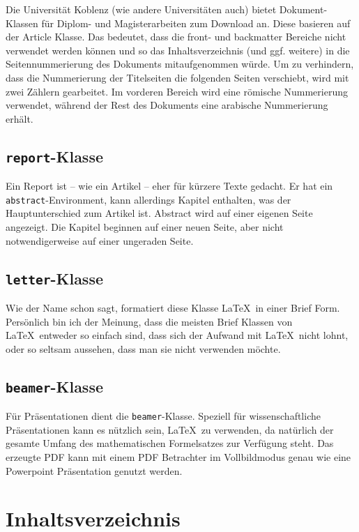  Die Universität Koblenz (wie andere Universitäten auch) bietet Doku\-ment-Klassen für Diplom- und Magisterarbeiten zum Download an. Diese basieren auf der Article Klasse. Das bedeutet, dass die front- und backmatter Bereiche nicht verwendet werden können und so das Inhaltsverzeichnis (und ggf. weitere) in die Seitennummerierung des Dokuments mitaufgenommen würde. Um zu verhindern, dass die Nummerierung der Titelseiten die folgenden Seiten verschiebt, wird mit zwei Zählern gearbeitet. Im vorderen Bereich wird eine römische Nummerierung verwendet, während der Rest des Dokuments eine arabische Nummerierung erhält.


\subsection{\texttt{report}-Klasse}

Ein Report ist -- wie ein Artikel -- eher für kürzere Texte gedacht. Er hat ein \texttt{abstract}-Environment, kann allerdings Kapitel enthalten, was der Hauptunterschied zum Artikel ist. Abstract wird auf einer eigenen Seite angezeigt. Die Kapitel beginnen auf einer neuen Seite, aber nicht notwendigerweise auf einer ungeraden Seite. 


\subsection{\texttt{letter}-Klasse}

Wie der Name schon sagt, formatiert diese Klasse \LaTeX\ in einer Brief Form. Persönlich bin ich der Meinung, dass die meisten Brief Klassen von \LaTeX\ entweder so einfach sind, dass sich der Aufwand mit \LaTeX\ nicht lohnt, oder so seltsam aussehen, dass man sie nicht verwenden möchte.

\subsection{\texttt{beamer}-Klasse}

Für Präsentationen dient die \texttt{beamer}-Klasse. Speziell für wissenschaftliche Präsentationen kann es nützlich sein, \LaTeX\ zu verwenden, da natürlich der gesamte Umfang des mathematischen Formelsatzes zur Verfügung steht. Das erzeugte PDF kann mit einem PDF Betrachter im Vollbildmodus genau wie eine Powerpoint Präsentation genutzt werden. 


\section{Inhaltsverzeichnis}\label{chap:content}

